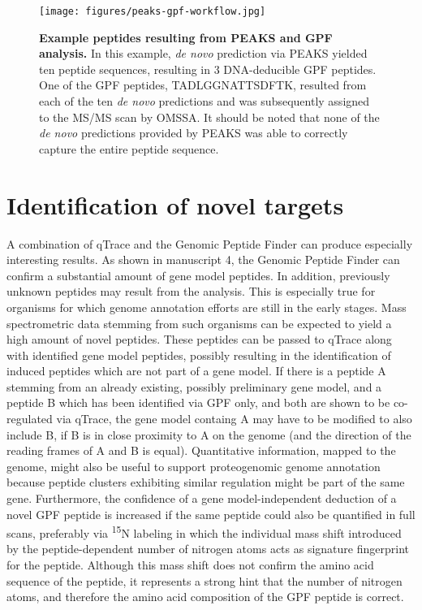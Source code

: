 \begin{figure}
\texttt{[image: figures/peaks-gpf-workflow.jpg]}
\caption{
    {\bf Example peptides resulting from PEAKS and GPF analysis.}
    In this example, {\em de novo} prediction via PEAKS yielded
    ten peptide sequences, resulting in 3 DNA-deducible GPF peptides.
    One of the GPF peptides, TADLGGNATTSDFTK, resulted from each of
    the ten {\em de novo} predictions and was subsequently assigned
    to the MS/MS scan by OMSSA.
    It should be noted that none of the {\em de novo} predictions
    provided by PEAKS was able to correctly capture the entire peptide 
    sequence.
}
\label{fig:peaks-gpf-workflow}
\end{figure}


\section{Identification of novel targets}

A combination of qTrace and the Genomic Peptide Finder can produce especially
interesting results.
As shown in manuscript 4, the Genomic Peptide Finder can confirm a substantial
amount of gene model peptides.
In addition, previously unknown peptides may result from the analysis.
This is especially true for organisms for which genome annotation efforts
are still in the early stages.
Mass spectrometric data stemming from such organisms can be expected to
yield a high amount of novel peptides.
These peptides can be passed to qTrace along with identified gene model 
peptides, possibly resulting in the identification of induced peptides which
are not part of a gene model.
If there is a peptide A stemming from an already existing, possibly preliminary 
gene model, and a peptide B which has been identified via GPF only, and both
are shown to be co-regulated via qTrace, the gene model containg A may have to 
be modified to also include B, if B is in close proximity to A
on the genome (and the direction of the reading frames of A and B is equal).
Quantitative information, mapped to the genome, might also be useful to
support proteogenomic genome annotation because peptide clusters exhibiting 
similar regulation might be part of the same gene.
Furthermore, the confidence of a gene model-independent deduction of a novel 
GPF peptide is increased if the same peptide could also be quantified in full
scans, preferably via \textsuperscript{15}N labeling in which the individual
mass shift introduced by the peptide-dependent number of nitrogen atoms acts
as signature fingerprint for the peptide.
Although this mass shift does not confirm the amino acid sequence of the 
peptide, it represents a strong hint that the number of nitrogen atoms, and
therefore the amino acid composition of the GPF peptide is correct.

